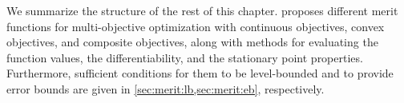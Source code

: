\documentclass[../main]{subfiles}
\begin{document}
We summarize the structure of the rest of this chapter.
 proposes different merit functions for multi-objective optimization with continuous objectives, convex objectives, and composite objectives, along with methods for evaluating the function values, the differentiability, and the stationary point properties.
Furthermore, sufficient conditions for them to be level-bounded and to provide error bounds are given in \cref{sec:merit:lb,sec:merit:eb}, respectively.
\end{document}

